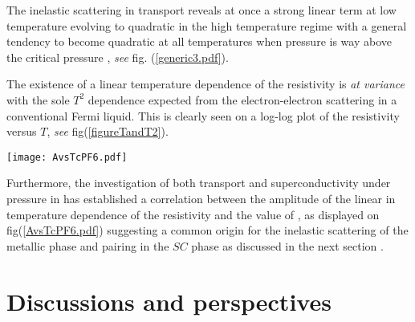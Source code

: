 \documentclass[11pt]{article} %
\begin{document}

The inelastic scattering in transport
 reveals at once a strong  linear term  at low temperature evolving to quadratic in the high temperature regime with a general tendency to become quadratic at all temperatures when pressure is way above the critical pressure \pc\cite{Doiron09}, \textit{see} fig. (\ref{generic3.pdf}). 

 The existence of a linear temperature dependence of the resistivity is \textit{at variance} with the sole $T^2$ dependence expected from the electron-electron scattering in a conventional Fermi liquid. This is clearly  seen on a log-log plot of the resistivity versus $T$, \textit{see} fig(\ref{figureTandT2}). 
\begin{figure*}[htbp]	
\centerline{ \texttt{[image: AvsTcPF6.pdf]}}
\caption{Coefficient $A$ of linear resistivity as a function of $T_c$ plotted versus $T_{c}/T_{c0}$  for . $T_c$ is defined as the midpoint of the transition and the error bars come from the 10~\% and 90~\% points with  $T_{c0}=1.23K$ under the pressure of 8 kbar which provides the maximum \tc in the $SDW$/$SC$ coexistence regime.The dashed line is a linear fit to all data points except that at $T_c$~=~0.87~K, according to ref\cite{Doiron09}.}
\label{AvsTcPF6.pdf} 
\end{figure*}
Furthermore, the investigation of both transport and superconductivity under pressure in   has  established a  correlation between  the amplitude %
of   the linear in temperature dependence of the resistivity  and the value of  \tc, as displayed on fig(\ref{AvsTcPF6.pdf}) suggesting  a common origin for  the inelastic scattering of the metallic phase and pairing in the $SC$ phase \cite{Doiron09} as discussed in the next section . 

\section{Discussions and perspectives}
\end{document}
